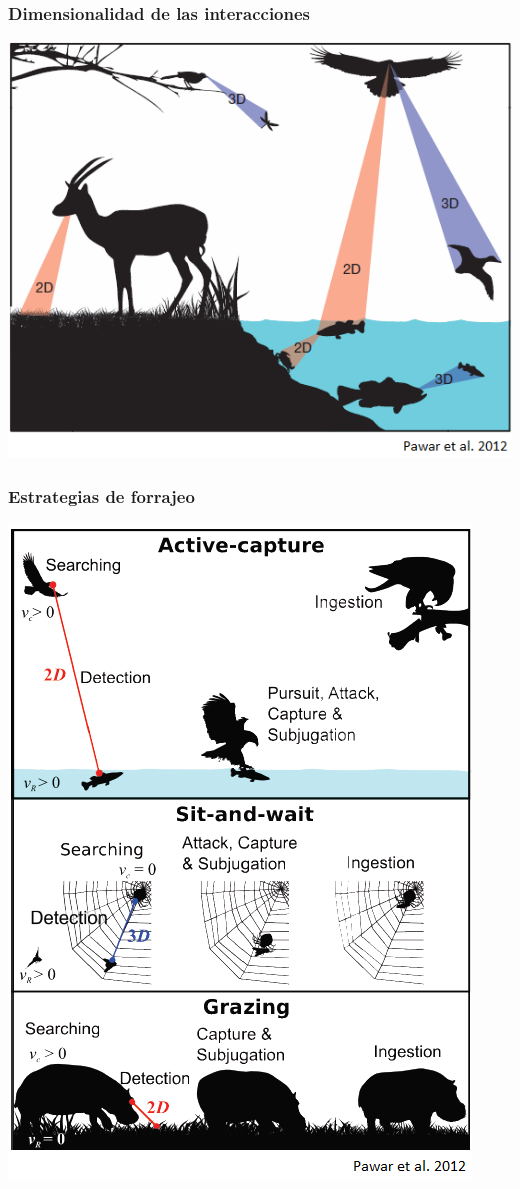 \documentclass[11 pt,t]{beamer}
\begin{document}
\begin{frame}
  \frametitle{Dimensionalidad de las interacciones}
  \centering
  \includegraphics[width = 0.7\linewidth]{Pics/dimensionality.png}      
\end{frame}
\begin{frame}
  \frametitle{Estrategias de forrajeo}
  \centering
  \includegraphics[width = 0.5\linewidth]{Pics/capture.png}
\end{frame}
\end{document}
